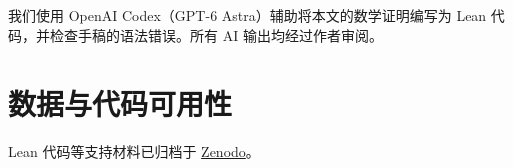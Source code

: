 \begin{acknowledgments}
我们使用 OpenAI Codex（GPT-6 Astra）辅助将本文的数学证明编写为 Lean 代码，并检查手稿的语法错误。所有 AI 输出均经过作者审阅。
\end{acknowledgments}

\section*{数据与代码可用性}
Lean 代码等支持材料已归档于 \href{https://doi.org/10.5281/zenodo.23882488}{Zenodo}。
